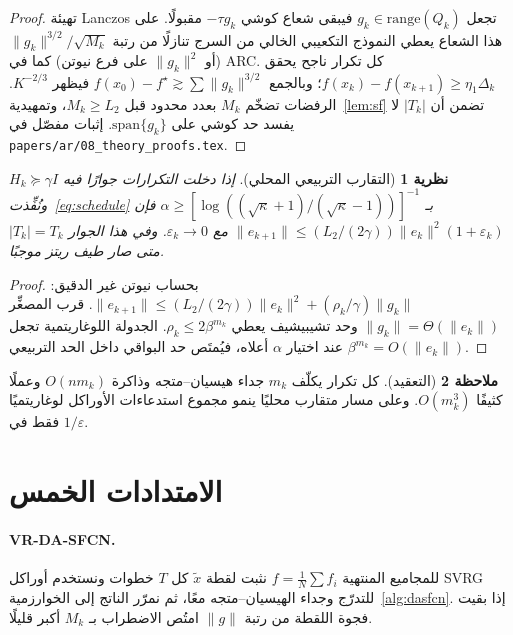 \documentclass[12pt,a4paper]{article}
\newtheorem{theorem}{نظرية}
\theoremstyle{definition}
\newtheorem{remark}[theorem]{ملاحظة}
\begin{document}
\begin{proof}
تهيئة \textenglish{Lanczos} تجعل $g_k\in\mathrm{range}(Q_k)$ فيبقى شعاع
كوشي $-\tau g_k$ مقبولًا. على هذا الشعاع يعطي النموذج التكعيبي الخالي من
السرج تنازلًا من رتبة $\|g_k\|^{3/2}/\sqrt{M_k}$ (أو $\|g_k\|^2$ على فرع
نيوتن) كما في \textenglish{ARC}. كل تكرار ناجح يحقق
$f(x_k)-f(x_{k+1})\ge\eta_1\Delta_k$؛ وبالجمع
$f(x_0)-f^\star\gtrsim\sum\|g_k\|^{3/2}$ فيظهر $K^{-2/3}$.
الرفضات تضخّم $M_k$ بعدد محدود قبل $M_k\ge L_2$، وتمهيدية~\ref{lem:sf}
تضمن أن $|T_k|$ لا يفسد حد كوشي على $\mathrm{span}\{g_k\}$.
إثبات مفصّل في \texttt{papers/ar/08\_theory\_proofs.tex}.
\end{proof}

\begin{theorem}[التقارب التربيعي المحلي]\label{thm:local}
إذا دخلت التكرارات جوارًا فيه $H_k\succeq\gamma I$ ونُفِّذت~\eqref{eq:schedule}
بـ $\alpha\ge[\log((\sqrt{\kappa}+1)/(\sqrt{\kappa}-1))]^{-1}$ فإن
$\|e_{k+1}\|\le (L_2/(2\gamma))\|e_k\|^2(1+\varepsilon_k)$ مع
$\varepsilon_k\to 0$. وفي هذا الجوار $|T_k|=T_k$ متى صار طيف ريتز موجبًا.
\end{theorem}

\begin{proof}
بحساب نيوتن غير الدقيق:
$\|e_{k+1}\|\le(L_2/(2\gamma))\|e_k\|^2+(\rho_k/\gamma)\|g_k\|$.
قرب المصغِّر $\|g_k\|=\Theta(\|e_k\|)$ وحد تشيبيشيف يعطي
$\rho_k\le 2\beta^{m_k}$. الجدولة اللوغاريتمية تجعل
$\beta^{m_k}=O(\|e_k\|)$ عند اختيار $\alpha$ أعلاه، فيُمتَص حد البواقي داخل
الحد التربيعي.
\end{proof}

\begin{remark}[التعقيد]
كل تكرار يكلّف $m_k$ جداء هيسيان--متجه وذاكرة $O(nm_k)$ وعملًا كثيفًا
$O(m_k^3)$. وعلى مسار متقارب محليًا ينمو مجموع استدعاءات الأوراكل
لوغاريتميًا فقط في $1/\varepsilon$.
\end{remark}

\section{الامتدادات الخمس}
\paragraph{\textenglish{VR-DA-SFCN}.}
للمجاميع المنتهية $f=\frac1N\sum f_i$ نثبت لقطة $\tilde x$ كل $T$ خطوات
ونستخدم أوراكل \textenglish{SVRG} للتدرّج وجداء الهيسيان--متجه معًا، ثم
نمرّر الناتج إلى الخوارزمية~\ref{alg:dasfcn}. إذا بقيت فجوة اللقطة من رتبة
$\|g\|$ امتُص الاضطراب بـ $M_k$ أكبر قليلًا.
\end{document}

